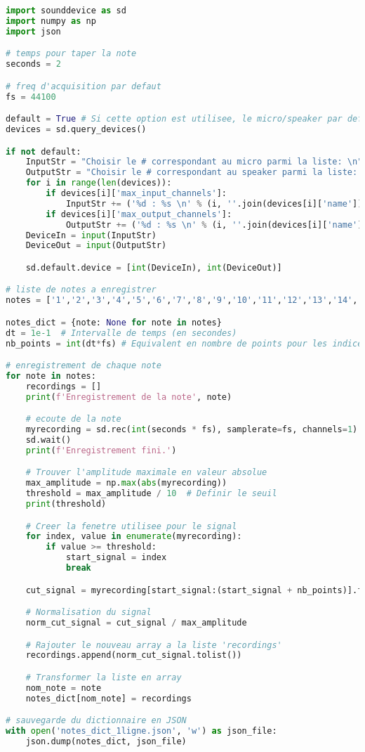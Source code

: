 \documentclass[11pt,letterpaper]{article}
\begin{document}
\begin{lstlisting}[language=python]
import sounddevice as sd
import numpy as np
import json

# temps pour taper la note
seconds = 2 

# freq d'acquisition par defaut
fs = 44100    

default = True # Si cette option est utilisee, le micro/speaker par defaut est utilise
devices = sd.query_devices()

if not default:
    InputStr = "Choisir le # correspondant au micro parmi la liste: \n"
    OutputStr = "Choisir le # correspondant au speaker parmi la liste: \n"
    for i in range(len(devices)):
        if devices[i]['max_input_channels']:
            InputStr += ('%d : %s \n' % (i, ''.join(devices[i]['name'])))
        if devices[i]['max_output_channels']:
            OutputStr += ('%d : %s \n' % (i, ''.join(devices[i]['name'])))
    DeviceIn = input(InputStr)
    DeviceOut = input(OutputStr)

    sd.default.device = [int(DeviceIn), int(DeviceOut)]

# liste de notes a enregistrer
notes = ['1','2','3','4','5','6','7','8','9','10','11','12','13','14','15','16','17']

notes_dict = {note: None for note in notes}
dt = 1e-1  # Intervalle de temps (en secondes)
nb_points = int(dt*fs) # Equivalent en nombre de points pour les indices

# enregistrement de chaque note
for note in notes:
    recordings = []
    print(f'Enregistrement de la note', note)

    # ecoute de la note
    myrecording = sd.rec(int(seconds * fs), samplerate=fs, channels=1)
    sd.wait()
    print(f'Enregistrement fini.')

    # Trouver l'amplitude maximale en valeur absolue
    max_amplitude = np.max(abs(myrecording))
    threshold = max_amplitude / 10  # Definir le seuil
    print(threshold)

    # Creer la fenetre utilisee pour le signal
    for index, value in enumerate(myrecording):
        if value >= threshold:
            start_signal = index
            break

    cut_signal = myrecording[start_signal:(start_signal + nb_points)].flatten()

    # Normalisation du signal
    norm_cut_signal = cut_signal / max_amplitude

    # Rajouter le nouveau array a la liste 'recordings'
    recordings.append(norm_cut_signal.tolist())

    # Transformer la liste en array
    nom_note = note
    notes_dict[nom_note] = recordings

# sauvegarde du dictionnaire en JSON
with open('notes_dict_1ligne.json', 'w') as json_file:
    json.dump(notes_dict, json_file)
\end{lstlisting}
\end{document}
